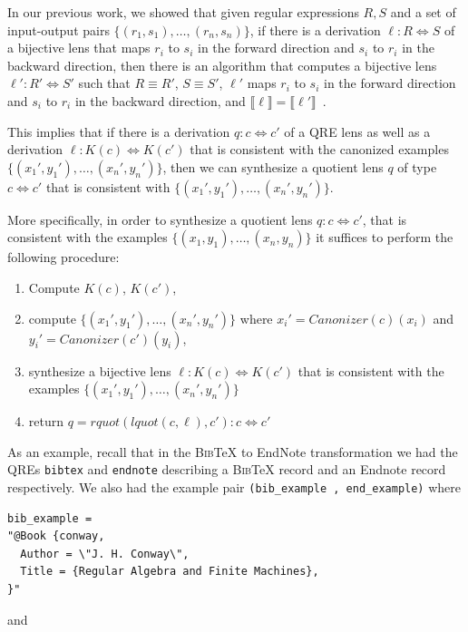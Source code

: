 \documentclass{svproc}
\newcommand{\cd}[1]{\lstinline[backgroundcolor=\color{white}]$#1$}
\newcommand{\canonizer}{\ensuremath{\mathit{Canonizer}}}
\newcommand{\bibtex}{\textsc{Bib}\TeX{}}
\begin{document}
In our previous work, we showed that given regular expressions $R, S$ and a set
of input-output pairs $\{(r_1, s_1), \ldots, (r_n, s_n)\}$, if there is a
derivation $\ell : R \Leftrightarrow S$ of a bijective lens that maps $r_i$ to
$s_i$ in the forward direction and $s_i$ to $r_i$ in the backward direction,
then there is an algorithm that computes a bijective lens $\ell' : R'
\Leftrightarrow S'$ such that $R \equiv R'$, $S \equiv S'$, $\ell'$ maps $r_i$
to $s_i$ in the forward direction and $s_i$ to $r_i$ in the backward direction,
and $\llbracket \ell \rrbracket = \llbracket \ell' \rrbracket$~\cite{popl18}.

This implies that if there is a derivation $q : c \Leftrightarrow
c'$ of a QRE lens as well as a derivation $\ell : K(c) \Leftrightarrow K(c')$
that is consistent with the canonized examples $\{({x_1}', {y_1}'),
\ldots, ({x_n}', {y_n}')\}$, then we can synthesize a quotient lens $q$ of
type $c \Leftrightarrow c'$ that is consistent with $\{({x_1}', {y_1}'),
\ldots, ({x_n}', {y_n}')\}$.

More specifically, in order to synthesize a quotient lens $q: c \Leftrightarrow
c'$, that is consistent with the examples $\{(x_1, y_1), \ldots, (x_n, y_n)\}$
 it suffices to perform the following procedure:
\begin{enumerate}
  \item
  Compute $K(c)$, $K(c')$,
  \item
  compute $\{({x_1}', {y_1}'), \ldots, ({x_n}', {y_n}')\}$ where ${x_i}' =
  \canonizer(c)(x_i)$ and ${y_i}' = \canonizer(c')(y_i)$,
  \item
    synthesize a bijective lens $\ell : K(c) \Leftrightarrow K(c')$ that is
    consistent with the examples $\{({x_1}', {y_1}'), \ldots, ({x_n}',
    {y_n}')\}$
  \item 
  return $q = \mathit{rquot}(\mathit{lquot}(c, \ell), c') : c \Leftrightarrow
  c'$
\end{enumerate}
As an example, recall that
in the \bibtex{} to EndNote transformation we had the QREs \cd{bibtex} and \cd{endnote} describing a \bibtex{} record and an
Endnote record respectively. We also had the example pair 
\cd{(bib_example , end_example)} where

\begin{lstlisting}
bib_example = 
"@Book {conway,
  Author = \"J. H. Conway\",
  Title = {Regular Algebra and Finite Machines},
}"
\end{lstlisting}

\noindent and
\end{document}
